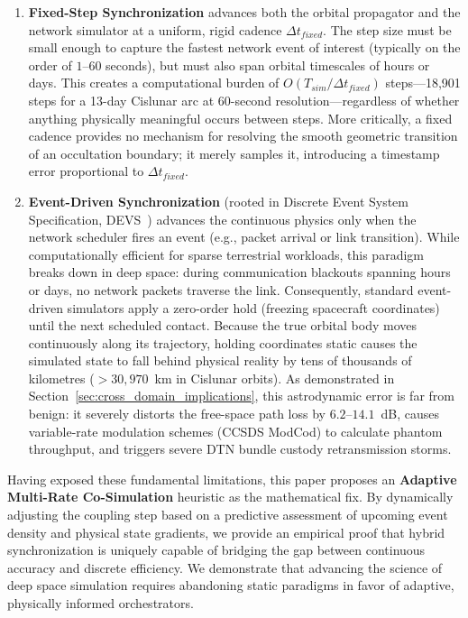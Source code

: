 \documentclass[a4paper,fleqn]{cas-sc}
\begin{document}
\begin{enumerate}
    \item \textbf{Fixed-Step Synchronization} advances both the orbital propagator and the network simulator at a uniform, rigid cadence $\Delta t_{fixed}$. The step size must be small enough to capture the fastest network event of interest (typically on the order of $1$--$60$ seconds), but must also span orbital timescales of hours or days. This creates a computational burden of $O(T_{sim}/\Delta t_{fixed})$ steps---18,901 steps for a 13-day Cislunar arc at 60-second resolution---regardless of whether anything physically meaningful occurs between steps. More critically, a fixed cadence provides no mechanism for resolving the smooth geometric transition of an occultation boundary; it merely samples it, introducing a timestamp error proportional to $\Delta t_{fixed}$.

    \item \textbf{Event-Driven Synchronization} (rooted in Discrete Event System Specification, DEVS~\cite{zeigler2000}) advances the continuous physics only when the network scheduler fires an event (e.g., packet arrival or link transition). While computationally efficient for sparse terrestrial workloads, this paradigm breaks down in deep space: during communication blackouts spanning hours or days, no network packets traverse the link. Consequently, standard event-driven simulators apply a zero-order hold (freezing spacecraft coordinates) until the next scheduled contact. Because the true orbital body moves continuously along its trajectory, holding coordinates static causes the simulated state to fall behind physical reality by tens of thousands of kilometres ($>30,970$~km in Cislunar orbits). As demonstrated in Section~\ref{sec:cross_domain_implications}, this astrodynamic error is far from benign: it severely distorts the free-space path loss by $6.2$--$14.1$~dB, causes variable-rate modulation schemes (CCSDS ModCod) to calculate phantom throughput, and triggers severe DTN bundle custody retransmission storms.
\end{enumerate}

Having exposed these fundamental limitations, this paper proposes an \textbf{Adaptive Multi-Rate Co-Simulation} heuristic as the mathematical fix. By dynamically adjusting the coupling step based on a predictive assessment of upcoming event density and physical state gradients, we provide an empirical proof that hybrid synchronization is uniquely capable of bridging the gap between continuous accuracy and discrete efficiency. We demonstrate that advancing the science of deep space simulation requires abandoning static paradigms in favor of adaptive, physically informed orchestrators.
\end{document}
